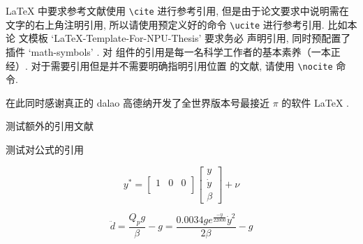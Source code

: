 \LaTeX{} 中要求参考文献使用 \lstinline`\cite` 进行参考引用, 但是由于论文要求中说明需在
文字的右上角注明引用, 所以请使用预定义好的命令 \lstinline`\ucite` 进行参考引用. 比如本论
文模板 `LaTeX-Template-For-NPU-Thesis'  要求务必
声明引用, 同时预配置了插件 `math-symbols' . 对
组件的引用是每一名科学工作者的基本素养（一本正经）. 对于需要引用但是并不需要明确指明引用位置
的文献, 请使用 \lstinline`\nocite` 命令.

在此同时感谢真正的 dalao 高德纳开发了全世界版本号最接近 $\pi$ 的软件 \LaTeX{}
\nocite{lamport1989latex:}.

测试额外的引用文献 

测试对公式的引用

$$
y^*=\begin{bmatrix}1&0&0\\ \end{bmatrix}\begin{bmatrix}y\\\dot{y}\\\beta \end{bmatrix}+\nu
$$

\begin{equation}
\ddot{d}=\frac{Q_{p}g}{\beta}-g=\frac{0.0034ge^{\frac{-y}{22000}} \dot{y}^{2}}{2\beta}-g \label{4}
\end{equation}

\endinput
